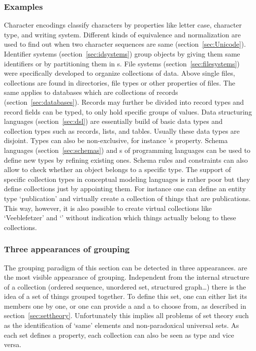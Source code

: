 \subsubsection{Examples}

Character encodings classify characters by properties like letter case,
character type, and writing system.  Different kinds of equivalence and
normalization are used to find out when two character sequences are same
(section~\ref{sec:Unicode}). Identifier systems (section~\ref{sec:idsystems})
group objects by giving them same identifiers or by partitioning them in
s.  File systems (section~\ref{sec:filesystems}) were
specifically developed to organize collections of data. Above single files,
collections are found in directories, file types or other properties of files.
The same applies to databases which are collections of records
(section~\ref{sec:databases}). Records may further be divided into record types
and record fields can be typed, to only hold specific groups of values. Data
structuring languages (section~\ref{sec:dsl}) are essentially build of basic
data types and collection types such as records, lists, and tables.  Usually
these data types are disjoint.  Types can also be non-exclusive, for instance
's  property.  Schema languages
(section~\ref{sec:schemas}) and s of programming languages
can be used to define new types by refining existing ones. Schema rules and
constraints can also allow to check whether an object belongs to a specific
type. The support of specific collection types in conceptual modeling languages
is rather poor \cite[ch.  10.4]{Halpin2008} but they define collections just by
appointing them. For instance one can define an entity type `publication' and
virtually create a collection of things that are publications. This way,
however, it is also possible to create virtual collections like `Veeblefetzer'
and `' without indication which things actually belong to these
collections.

\subsubsection{Three appearances of grouping}

The grouping paradigm of this section can be detected in three appearances.
 are the most visible appearance of grouping.
Independent from the internal structure of a collection (ordered sequence,
unordered set, structured graph\ldots) there is the idea of a set of things
grouped together. To define this set, one can either list its members one by
one, or one can provide a  and a 
to choose from, as described in section~\ref{sec:settheory}. Unfortunately this
implies all problems of set theory such as the identification of `same'
elements and non-paradoxical universal sets. As each set defines a property,
each collection can also be seen as type and vice versa.

